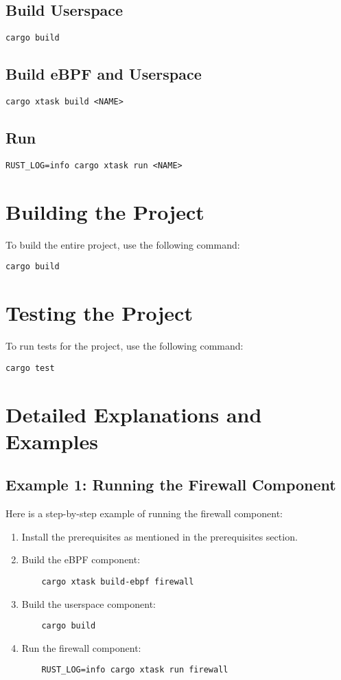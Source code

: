 \documentclass{article}
\begin{document}
\subsection{Build Userspace}
\begin{verbatim}
cargo build
\end{verbatim}

\subsection{Build eBPF and Userspace}
\begin{verbatim}
cargo xtask build <NAME>
\end{verbatim}

\subsection{Run}
\begin{verbatim}
RUST_LOG=info cargo xtask run <NAME>
\end{verbatim}

\section{Building the Project}
To build the entire project, use the following command:
\begin{verbatim}
cargo build
\end{verbatim}

\section{Testing the Project}
To run tests for the project, use the following command:
\begin{verbatim}
cargo test
\end{verbatim}

\section{Detailed Explanations and Examples}
\subsection{Example 1: Running the Firewall Component}
Here is a step-by-step example of running the firewall component:
\begin{enumerate}
    \item Install the prerequisites as mentioned in the prerequisites section.
    \item Build the eBPF component:
    \begin{verbatim}
    cargo xtask build-ebpf firewall
    \end{verbatim}
    \item Build the userspace component:
    \begin{verbatim}
    cargo build
    \end{verbatim}
    \item Run the firewall component:
    \begin{verbatim}
    RUST_LOG=info cargo xtask run firewall
    \end{verbatim}
\end{enumerate}
\end{document}
